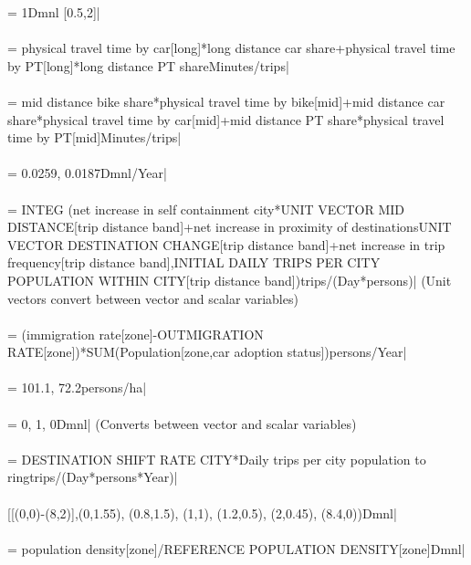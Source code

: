  = 1Dmnl [0.5,2]| \\ \\ 
 = physical travel time by car[long]*long distance car share+physical travel time by PT[long]*long distance PT shareMinutes/trips| \\ \\ 
 = mid distance bike share*physical travel time by bike[mid]+mid distance car share*physical travel time by car[mid]+mid distance PT share*physical travel time by PT[mid]Minutes/trips| \\ \\ 
 = 0.0259, 0.0187Dmnl/Year| \\ \\ 
 =  INTEG (net increase in self containment city*UNIT VECTOR MID DISTANCE[trip distance band]+net increase in proximity of destinations\*UNIT VECTOR DESTINATION CHANGE[trip distance band]+net increase in trip frequency[trip distance band],INITIAL DAILY TRIPS PER CITY POPULATION WITHIN CITY[trip distance band])trips/(Day*persons)| (Unit vectors convert between vector and scalar variables) \\ \\ 
 = (immigration rate[zone]-OUTMIGRATION RATE[zone])*SUM(Population[zone,car adoption status\!])persons/Year| \\ \\ 
 = 101.1, 72.2persons/ha| \\ \\ 
 = 0, 1, 0Dmnl| (Converts between vector and scalar variables) \\ \\ 
 = DESTINATION SHIFT RATE CITY*Daily trips per city population to ringtrips/(Day*persons*Year)| \\ \\ 
 [[(0,0)-(8,2)],(0,1.55), (0.8,1.5), (1,1), (1.2,0.5), (2,0.45), (8.4,0))Dmnl| \\ \\ 
 = population density[zone]/REFERENCE POPULATION DENSITY[zone]Dmnl| \\ \\ 
